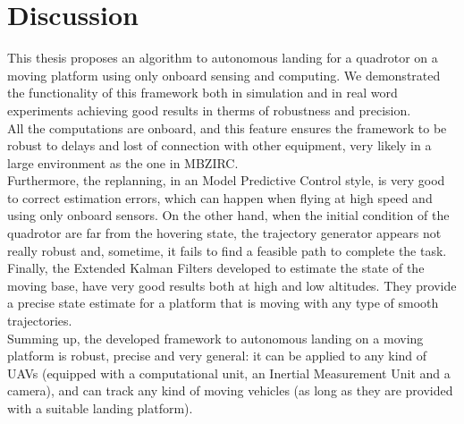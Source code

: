 \chapter{Discussion}\label{chap:discussion}
This thesis proposes an algorithm to autonomous landing for a quadrotor on a moving platform using only onboard sensing and computing.
We demonstrated the functionality of this framework both in simulation and in real word experiments achieving good results in therms of robustness and precision.\\

All the computations are onboard, and this feature ensures the framework to be robust to delays and lost of connection with other equipment, very likely in a large environment as the one in MBZIRC.\\
Furthermore, the replanning, in an Model Predictive Control style, is very good to correct estimation errors, which can happen when flying at high speed and using only onboard sensors. On the other hand, when the initial condition of the quadrotor are far from the hovering state, the trajectory generator appears not really robust and, sometime, it fails to find a feasible path to complete the task.\\
Finally, the Extended Kalman Filters developed to estimate the state of the moving base, have very good results both at high and low altitudes. They provide a precise state estimate for a platform that is moving with any type of smooth trajectories.\\

Summing up, the developed framework to autonomous landing on a moving platform is robust, precise and very general: it can be applied to any kind of UAVs (equipped with a computational unit, an Inertial Measurement Unit and a camera), and can track any kind of moving vehicles (as long as they are provided with a suitable landing platform).

